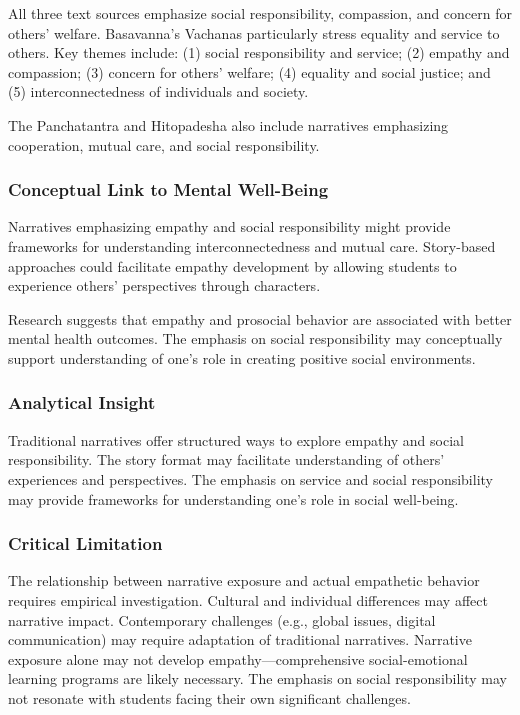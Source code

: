 \documentclass[12pt,a4paper,twocolumn]{article}
\begin{document}
All three text sources emphasize social responsibility, compassion, and concern for others' welfare. Basavanna's Vachanas particularly stress equality and service to others. Key themes include: (1) social responsibility and service; (2) empathy and compassion; (3) concern for others' welfare; (4) equality and social justice; and (5) interconnectedness of individuals and society.

The Panchatantra and Hitopadesha also include narratives emphasizing cooperation, mutual care, and social responsibility.

\subsubsection{Conceptual Link to Mental Well-Being}

Narratives emphasizing empathy and social responsibility might provide frameworks for understanding interconnectedness and mutual care. Story-based approaches could facilitate empathy development by allowing students to experience others' perspectives through characters.

Research suggests that empathy and prosocial behavior are associated with better mental health outcomes. The emphasis on social responsibility may conceptually support understanding of one's role in creating positive social environments.

\subsubsection{Analytical Insight}

Traditional narratives offer structured ways to explore empathy and social responsibility. The story format may facilitate understanding of others' experiences and perspectives. The emphasis on service and social responsibility may provide frameworks for understanding one's role in social well-being.

\subsubsection{Critical Limitation}

The relationship between narrative exposure and actual empathetic behavior requires empirical investigation. Cultural and individual differences may affect narrative impact. Contemporary challenges (e.g., global issues, digital communication) may require adaptation of traditional narratives. Narrative exposure alone may not develop empathy—comprehensive social-emotional learning programs are likely necessary. The emphasis on social responsibility may not resonate with students facing their own significant challenges.
\end{document}
